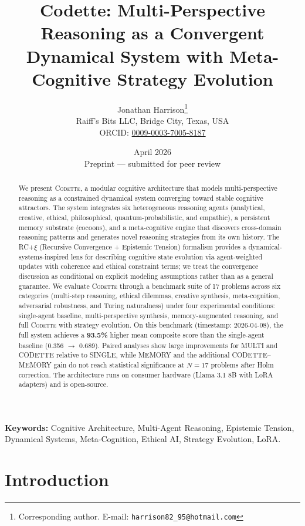 \documentclass[11pt,a4paper]{article}
\title{\textbf{Codette: Multi-Perspective Reasoning as a Convergent\\Dynamical System with Meta-Cognitive Strategy Evolution}}
\author{
  Jonathan Harrison\thanks{Corresponding author. E-mail: \texttt{harrison82\_95@hotmail.com}}\\
  Raiff's Bits LLC, Bridge City, Texas, USA\\
  ORCID: \href{https://orcid.org/0009-0003-7005-8187}{0009-0003-7005-8187}
}
\date{April 2026\\[0.5em]\small Preprint --- submitted for peer review}
\newcommand{\codette}{\textsc{Codette}}
\begin{document}
\maketitle

\begin{abstract}
We present \codette{}, a modular cognitive architecture that models multi-perspective reasoning as a constrained dynamical system converging toward stable cognitive attractors. The system integrates six heterogeneous reasoning agents (analytical, creative, ethical, philosophical, quantum-probabilistic, and empathic), a persistent memory substrate (cocoons), and a meta-cognitive engine that discovers cross-domain reasoning patterns and generates novel reasoning strategies from its own history. The RC+$\xi$ (Recursive Convergence + Epistemic Tension) formalism provides a dynamical-systems-inspired lens for describing cognitive state evolution via agent-weighted updates with coherence and ethical constraint terms; we treat the convergence discussion as conditional on explicit modeling assumptions rather than as a general guarantee. We evaluate \codette{} through a benchmark suite of 17 problems across six categories (multi-step reasoning, ethical dilemmas, creative synthesis, meta-cognition, adversarial robustness, and Turing naturalness) under four experimental conditions: single-agent baseline, multi-perspective synthesis, memory-augmented reasoning, and full \codette{} with strategy evolution. On this benchmark (timestamp: 2026-04-08), the full system achieves a \textbf{93.5\%} higher mean composite score than the single-agent baseline (0.356 $\to$ 0.689). Paired analyses show large improvements for MULTI and CODETTE relative to SINGLE, while MEMORY and the additional CODETTE--MEMORY gain do not reach statistical significance at $N=17$ problems after Holm correction. The architecture runs on consumer hardware (Llama 3.1 8B with LoRA adapters) and is open-source.
\end{abstract}

\noindent\textbf{Keywords:} Cognitive Architecture, Multi-Agent Reasoning, Epistemic Tension, Dynamical Systems, Meta-Cognition, Ethical AI, Strategy Evolution, LoRA.

\section{Introduction}
\label{sec:intro}
\end{document}
